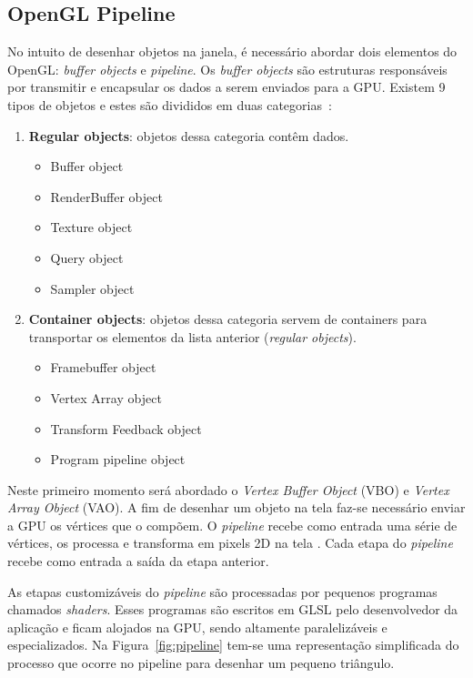 \documentclass[12pt, 
openright, 
oneside, 
a4paper,    
brazil]{facom-ufu-abntex2}
\begin{document}
\subsection{OpenGL Pipeline}
No intuito de desenhar objetos na janela, é necessário abordar dois elementos do OpenGL: \textit{buffer objects} e \textit{pipeline}. Os \textit{buffer objects} são estruturas responsáveis por transmitir e encapsular os dados a serem enviados para a GPU. Existem 9 tipos de objetos e estes são divididos em duas categorias~\cite{OpenGLObject}:

\begin{enumerate}
\item \textbf{Regular objects}: objetos dessa categoria contêm dados.
\begin{itemize}
\item Buffer object
\item RenderBuffer object
\item Texture object
\item Query object
\item Sampler object
\end{itemize}
\item \textbf{Container objects}:  objetos dessa categoria servem de containers para transportar os elementos da lista anterior (\textit{regular objects}). 
\begin{itemize}
\item Framebuffer object
\item Vertex Array object
\item Transform Feedback object
\item Program pipeline object
\end{itemize}
\end{enumerate}

Neste primeiro momento será abordado o \textit{Vertex Buffer Object} (VBO) e \textit{Vertex Array Object} (VAO). A fim de desenhar um objeto na tela faz-se necessário enviar a GPU os vértices que o compõem. O \textit{pipeline} recebe como entrada uma série de vértices, os processa e transforma em pixels 2D na tela \cite{LearnOpenGL}. Cada etapa do \textit{pipeline} recebe como entrada a saída da etapa anterior.

As etapas customizáveis do \textit{pipeline} são processadas por pequenos programas chamados \textit{shaders}. Esses programas são escritos em GLSL pelo desenvolvedor da aplicação e ficam alojados na GPU, sendo altamente paralelizáveis e especializados. Na Figura~\ref{fig:pipeline} tem-se uma representação simplificada do processo que ocorre no pipeline para desenhar um pequeno triângulo.
\end{document}
